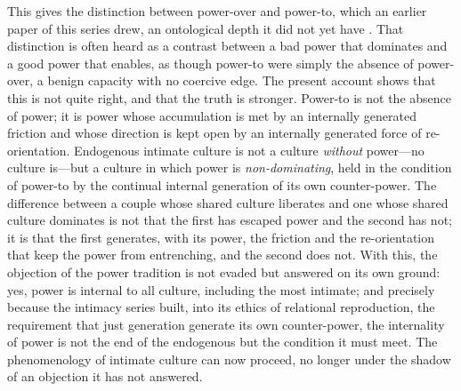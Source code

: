 This gives the distinction between power-over and power-to, which an earlier paper of this series drew, an ontological depth it did not yet have \parencite{paperxvii}. That distinction is often heard as a contrast between a bad power that dominates and a good power that enables, as though power-to were simply the absence of power-over, a benign capacity with no coercive edge. The present account shows that this is not quite right, and that the truth is stronger. Power-to is not the absence of power; it is power whose accumulation is met by an internally generated friction and whose direction is kept open by an internally generated force of re-orientation. Endogenous intimate culture is not a culture \emph{without} power---no culture is---but a culture in which power is \emph{non-dominating}, held in the condition of power-to by the continual internal generation of its own counter-power. The difference between a couple whose shared culture liberates and one whose shared culture dominates is not that the first has escaped power and the second has not; it is that the first generates, with its power, the friction and the re-orientation that keep the power from entrenching, and the second does not. With this, the objection of the power tradition is not evaded but answered on its own ground: yes, power is internal to all culture, including the most intimate; and precisely because the intimacy series built, into its ethics of relational reproduction, the requirement that just generation generate its own counter-power, the internality of power is not the end of the endogenous but the condition it must meet. The phenomenology of intimate culture can now proceed, no longer under the shadow of an objection it has not answered.
